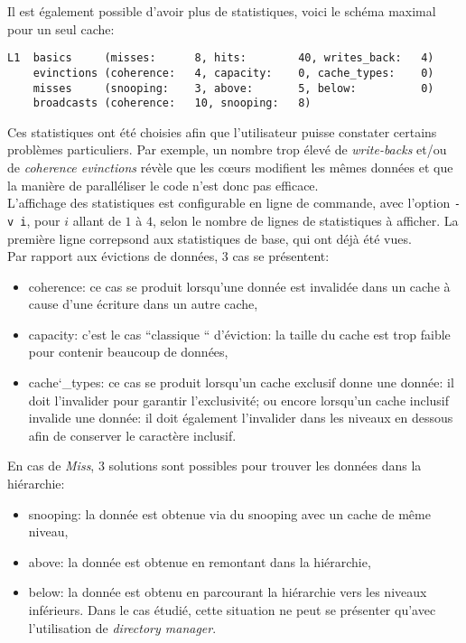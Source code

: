 Il est également possible d'avoir plus de statistiques, voici le schéma maximal pour un seul cache:
\begin{lstlisting}
L1  basics     (misses:      8, hits:        40, writes_back:   4)
    evinctions (coherence:   4, capacity:    0, cache_types:    0)
    misses     (snooping:    3, above:       5, below:          0)
    broadcasts (coherence:   10, snooping:   8)
\end{lstlisting}


Ces statistiques ont été choisies afin que l'utilisateur puisse constater certains problèmes particuliers. Par exemple, un nombre trop élevé de \emph{write-backs} et/ou de \emph{coherence evinctions} révèle que les c\oe urs modifient les mêmes données et que la manière de paralléliser le code n'est donc pas efficace. \\

L'affichage des statistiques est configurable en ligne de commande, avec l'option \texttt{-v i}, pour $i$ allant de $1$ à $4$, selon le nombre de lignes de statistiques à afficher. La première ligne correpsond aux statistiques de base, qui ont déjà été vues. \\

Par rapport aux évictions de données, $3$ cas se présentent:
\begin{itemize}
\item coherence: ce cas se produit lorsqu'une donnée est invalidée dans un cache à cause d'une écriture dans un autre cache,
\item capacity: c'est le cas ``classique `` d'éviction: la taille du cache est trop faible pour contenir beaucoup de données,
\item cache\char`_types: ce cas se produit lorsqu'un cache exclusif donne une donnée: il doit l'invalider pour garantir l'exclusivité; ou encore lorsqu'un cache inclusif invalide une donnée: il doit également l'invalider dans les niveaux en dessous afin de conserver le caractère inclusif. \\ 
\end{itemize}

En cas de \emph{Miss}, $3$ solutions sont possibles pour trouver les données dans la hiérarchie:
\begin{itemize}
\item snooping: la donnée est obtenue via du snooping avec un cache de même niveau,
\item above: la donnée est obtenue en remontant dans la hiérarchie,
\item below: la donnée est obtenu en parcourant la hiérarchie vers les niveaux inférieurs. Dans le cas étudié, cette situation ne peut se présenter qu'avec l'utilisation de \emph{directory manager}. \\
\end{itemize}

